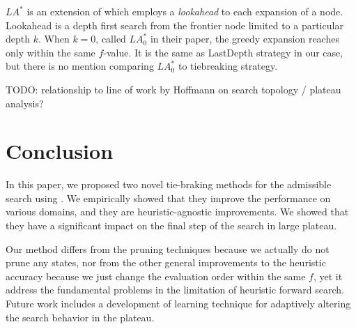 $LA^*$ \cite{stern2010look} is an extension of \astar which employs a
\emph{lookahead} to each expansion of a node. Lookahead is a depth first
search from the frontier node limited to a particular depth $k$. When
$k=0$, called $LA^*_0$ in their paper, the greedy expansion reaches only within
the same $f$-value. It is the same as LastDepth strategy in our
case, but there is no mention comparing $LA^*_0$ to tiebreaking strategy.


TODO: relationship to line of work by Hoffmann on search topology / plateau analysis? 
\cite{Hoffmann05,Hoffmann14}


\section{Conclusion}

In this paper, we proposed two novel tie-braking methods for the admissible search using \astar. We empirically showed that they improve the performance on various domains, and they are heuristic-agnostic improvements. We showed that they have a significant impact on the final step of the search in large plateau.

Our method differs from the pruning techniques because we actually
do not prune any states, nor from the other general improvements to the
heuristic accuracy because we just change the evaluation order within the
same $f$, yet it address the fundamental problems in the limitation of
heuristic forward search.  Future work includes a development of learning
technique for adaptively altering the search behavior in the plateau.



